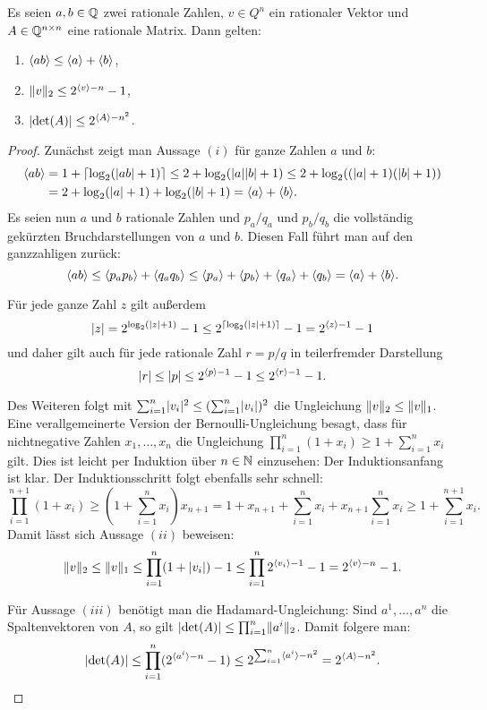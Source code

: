 \begin{proposition}\label{prop-rational-bounds-encoding}
	Es seien $a,b\in\mathbb{Q}$ zwei rationale Zahlen, $v\in Q^n$ ein rationaler Vektor und $A\in\mathbb{Q}^{n\times n}$ eine rationale Matrix.
	Dann gelten:
	\begin{enumerate}[label=(\roman*)]
		\item $\langle ab\rangle \leq \langle a\rangle+\langle b\rangle$,
		\item $\lVert v\rVert_2 \leq 2^{\langle v\rangle - n} - 1$,
		\item $\lvert\det(A)\rvert \leq 2^{\langle A\rangle - n^2}$.
	\end{enumerate}
\end{proposition}
\begin{proof}
	Zunächst zeigt man Aussage $(i)$ für ganze Zahlen $a$ und $b$:
	\begin{align*}
		\langle ab\rangle &= 1+\lceil \log_2(\lvert ab\rvert + 1) \rceil \leq 2+\log_2(\lvert a\rvert\lvert b\rvert+1) \leq 2+\log_2((\lvert a\rvert+1)(\lvert b\rvert+1))\\
		&=2+\log_2(\lvert a\rvert + 1) + \log_2(\lvert b\rvert + 1) = \langle a\rangle + \langle b\rangle.
	\end{align*}
	Es seien nun $a$ und $b$ rationale Zahlen und $p_a/q_a$ und $p_b/q_b$ die vollständig gekürzten Bruchdarstellungen von $a$ und $b$.
	Diesen Fall führt man auf den ganzzahligen zurück: \[
	\langle ab\rangle \leq \langle p_a p_b\rangle + \langle q_a q_b\rangle \leq \langle p_a\rangle+\langle p_b\rangle + \langle q_a\rangle + \langle q_b\rangle = \langle a\rangle + \langle b\rangle.\]
	
	Für jede ganze Zahl $z$ gilt außerdem 
	\[
	\lvert z\rvert = 2^{\log_2(\lvert z\rvert + 1)} - 1 \leq 2^{\lceil\log_2(\lvert z\rvert + 1)\rceil} - 1 = 2^{\langle z\rangle - 1} - 1
	\]
	und daher gilt auch für jede rationale Zahl $r = p/q$ in teilerfremder Darstellung
	\[
	\lvert r\rvert \leq \lvert p\rvert \leq 2^{\langle p\rangle -1} - 1 \leq 2^{\langle r\rangle - 1} -1.
	\]
	
	Des Weiteren folgt mit $\sum_{i=1}^n \lvert v_i\rvert^2 \leq (\sum_{i=1}^n \lvert v_i\rvert)^2$ die Ungleichung $\lVert v\rVert_2 \leq \lVert v\rVert_1$.
	Eine verallgemeinerte Version der Bernoulli-Ungleichung besagt, dass für nichtnegative Zahlen $x_1,\dots,x_n$ die Ungleichung $\prod_{i=1}^n (1+x_i) \geq 1 + \sum_{i=1}^n x_i$ gilt.
	Dies ist leicht per Induktion über $n\in\mathbb{N}$ einzusehen:
	Der Induktionsanfang ist klar.
	Der Induktionsschritt folgt ebenfalls sehr schnell:
	\[
	\prod_{i=1}^{n+1} (1+x_i) \geq (1 + \sum_{i=1}^n x_i) x_{n+1} = 1 + x_{n+1} + \sum_{i=1}^n x_i + x_{n+1} \sum_{i=1}^n x_i \geq 1 + \sum_{i=1}^{n+1} x_i.
	\]
	Damit lässt sich Aussage $(ii)$ beweisen:
	\[
		\lVert v\rVert_2 \leq \lVert v\rVert_1 \leq \prod_{i=1}^{n} (1+\lvert v_i\rvert) - 1 \leq \prod_{i=1}^n 2^{\langle v_i\rangle - 1} - 1 = 2^{\langle v\rangle - n} - 1.
	\] 
	
	Für Aussage $(iii)$ benötigt man die Hadamard-Ungleichung: Sind $a^1, \dots, a^n$ die Spaltenvektoren von $A$, so gilt $\lvert\det(A)\rvert \leq  \prod_{i=1}^{n} \lVert a^i\rVert_2$.
	Damit folgere man:
	\[
		\lvert\det(A)\rvert \leq \prod_{i=1}^n (2^{\langle a^i\rangle - n} - 1) \leq 2^{\sum_{i=1}^n \langle a^i\rangle - n^2} = 2^{\langle A\rangle - n^2}.
	\]
\end{proof}

